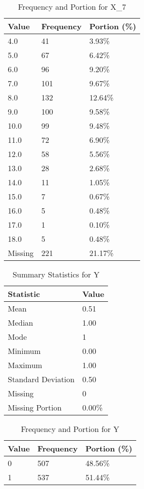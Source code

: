 \begin{table}[H]
\centering
\begin{tabular}{|l|l|l|}
\hline
\textbf{Value} & \textbf{Frequency} & \textbf{Portion (\%)} \\ \hline
4.0 & 41 & 3.93\% \\ \hline
5.0 & 67 & 6.42\% \\ \hline
6.0 & 96 & 9.20\% \\ \hline
7.0 & 101 & 9.67\% \\ \hline
8.0 & 132 & 12.64\% \\ \hline
9.0 & 100 & 9.58\% \\ \hline
10.0 & 99 & 9.48\% \\ \hline
11.0 & 72 & 6.90\% \\ \hline
12.0 & 58 & 5.56\% \\ \hline
13.0 & 28 & 2.68\% \\ \hline
14.0 & 11 & 1.05\% \\ \hline
15.0 & 7 & 0.67\% \\ \hline
16.0 & 5 & 0.48\% \\ \hline
17.0 & 1 & 0.10\% \\ \hline
18.0 & 5 & 0.48\% \\ \hline
Missing & 221 & 21.17\% \\ \hline
\end{tabular}
\caption{Frequency and Portion for X_7}
\end{table}

\begin{table}[H]
\centering
\begin{tabular}{|l|l|}
\hline
\textbf{Statistic} & \textbf{Value} \\ \hline
Mean               & 0.51 \\ \hline
Median             & 1.00 \\ \hline
Mode               & 1 \\ \hline
Minimum            & 0.00 \\ \hline
Maximum            & 1.00 \\ \hline
Standard Deviation & 0.50 \\ \hline
Missing            & 0 \\ \hline
Missing Portion    & 0.00\% \\ \hline
\end{tabular}
\caption{Summary Statistics for Y}
\end{table}

\begin{table}[H]
\centering
\begin{tabular}{|l|l|l|}
\hline
\textbf{Value} & \textbf{Frequency} & \textbf{Portion (\%)} \\ \hline
0 & 507 & 48.56\% \\ \hline
1 & 537 & 51.44\% \\ \hline
\end{tabular}
\caption{Frequency and Portion for Y}
\end{table}
